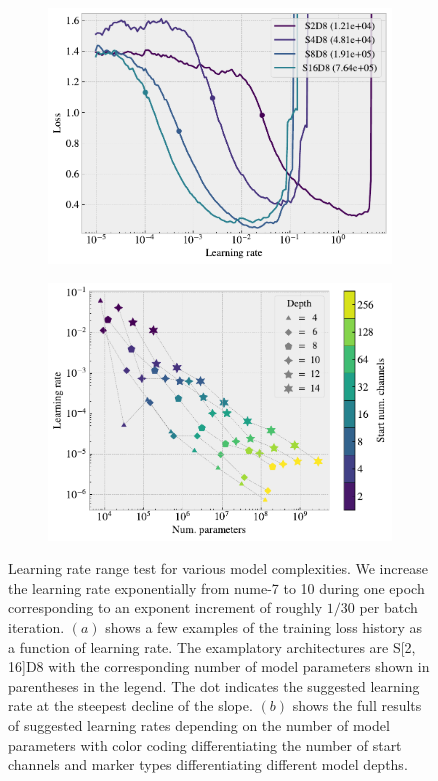 \begin{figure}[H]
  \centering
  \begin{subfigure}[t]{0.49\textwidth}
      \centering
      \includegraphics[width=\textwidth]{figures/ML/LR_range_specific.pdf}
      \caption{}
  \end{subfigure}
  \hfill
  \begin{subfigure}[t]{0.49\textwidth}
      \centering
      \includegraphics[width=\textwidth]{figures/ML/LR_range_full.pdf}
      \caption{}
  \end{subfigure}
  \hfill
  \caption{Learning rate range test for various model complexities. We increase the learning rate exponentially from num{e-7} to 10 during one epoch corresponding to an exponent increment of roughly $1/30$ per batch iteration. $(a)$ shows a few examples of the training loss history as a function of learning rate. The examplatory architectures are S[2, 16]D8 with the corresponding number of model parameters shown in parentheses in the legend. The dot indicates the suggested learning rate at the steepest decline of the slope. $(b)$ shows the full results of suggested learning rates depending on the number of model parameters with color coding differentiating the number of start channels and marker types differentiating different model depths. }
  \label{fig:LR_range}
\end{figure}

